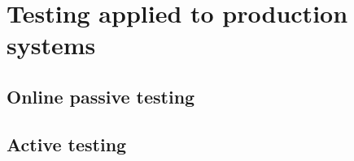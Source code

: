 %
\chapter{Testing applied to production systems}
\label{sec:testing}




\section{Online passive testing}
\label{sec:testing:onpassive}

\section{Active testing}
\label{sec:testing:active}
